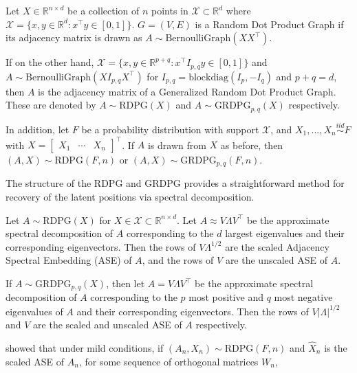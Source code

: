 \documentclass[
  11pt,
]{article}
\begin{document}
\begin{definition}
Let $X \in \mathbb{R}^{n \times d}$ be a collection of $n$ points in $\mathcal{X} \subset \mathbb{R}^d$ where $\mathcal{X} = \{x, y \in \mathbb{R}^d : x^\top y \in [0, 1]\}$. $G = (V, E)$ is a Random Dot Product Graph if its adjacency matrix is drawn as $A \sim \text{BernoulliGraph}(X X^\top)$. 

If on the other hand, $\mathcal{X} = \{x, y \in \mathbb{R}^{p+q} : x^\top I_{p, q} y \in [0, 1]\}$ and $A \sim \text{BernoulliGraph}(X I_{p, q} X^\top)$ for $I_{p, q} = \text{blockdiag}(I_p, -I_q)$ and $p + q = d$, then $A$ is the adjacency matrix of a Generalized Random Dot Product Graph. These are denoted by $A \sim \text{RDPG}(X)$ and $A \sim \text{GRDPG}_{p, q}(X)$ respectively.

In addition, let $F$ be a probability distribution with support $\mathcal{X}$, and $X_1, ..., X_n \stackrel{iid}{\sim} F$ with $X = \begin{bmatrix} X_1 & \cdots & X_n \end{bmatrix}^\top$. If $A$ is drawn from $X$ as before, then $(A, X) \sim \text{RDPG}(F, n)$ or $(A, X) \sim \text{GRDPG}_{p, q}(F, n)$. 
\end{definition}

The structure of the RDPG and GRDPG provides a straightforward method
for recovery of the latent positions via spectral decomposition.

\begin{definition}
Let $A \sim \text{RDPG}(X)$ for $X \in \mathcal{X} \subset \mathbb{R}^{n \times d}$. Let $A \approx V \Lambda V^\top$ be the approximate spectral decomposition of $A$ corresponding to the $d$ largest eigenvalues and their corresponding eigenvectors. Then the rows of $V \Lambda^{1/2}$ are the scaled Adjacency Spectral Embedding (ASE) of $A$, and the rows of $V$ are the unscaled ASE of $A$. 

If $A \sim \text{GRDPG}_{p, q}(X)$, then let $A = V \Lambda V^\top$ be the approximate spectral decomposition of $A$ corresponding to the $p$ most positive and $q$ most negative eigenvalues of $A$ and their corresponding eigenvectors. Then the rows of $V |\Lambda|^{1/2}$ and $V$ are the scaled and unscaled ASE of $A$ respectively.
\end{definition}

\citet{athreya2017statistical} showed that under mild conditions, if
\((A_n, X_n) \sim \text{RDPG}(F, n)\) and \(\hat{X}_n\) is the scaled
ASE of \(A_n\), for some sequence of orthogonal matrices \(W_n\),
\end{document}

